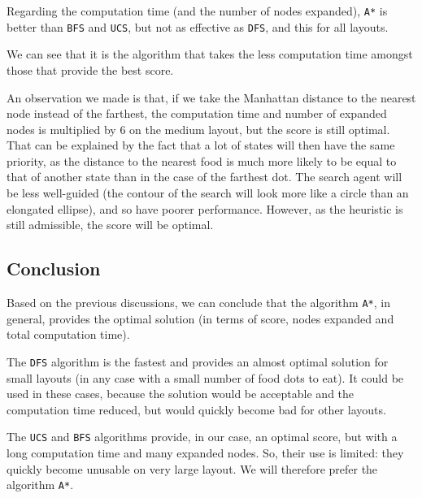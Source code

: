 \documentclass[a4paper, 12pt]{article}
\begin{document}
	Regarding the computation time (and the number of nodes expanded), \texttt{A*} is better than \texttt{BFS} and \texttt{UCS}, but not as effective as \texttt{DFS}, and this for all layouts.\par
	
	We can see that it is the algorithm that takes the less computation time amongst those that provide the best score.\par
	
	An observation we made is that, if we take the Manhattan distance to the nearest node instead of the farthest, the computation time and number of expanded nodes is multiplied by 6 on the medium layout, but the score is still optimal. That can be explained by the fact that a lot of states will then have the same priority, as the distance to the nearest food is much more likely to be equal to that of another state than in the case of the farthest dot. The search agent will be less well-guided (the contour of the search will look more like a circle than an elongated ellipse), and so have poorer performance. However, as the heuristic is still admissible, the score will be optimal.
	
	\subsection{Conclusion}
	Based on the previous discussions, we can conclude that the algorithm \texttt{A*}, in general, provides the optimal solution (in terms of score, nodes expanded and total computation time).\par
	
	The \texttt{DFS} algorithm is the fastest and provides an almost optimal solution for small layouts (in any case with a small number of food dots to eat). It could be used in these cases, because the solution would be acceptable and the computation time reduced, but would quickly become bad for other layouts.\par
	
	The \texttt{UCS} and \texttt{BFS} algorithms provide, in our case, an optimal score, but with a long computation time and many expanded nodes. So, their use is limited: they quickly become unusable on very large layout. We will therefore prefer the algorithm \texttt{A*}.
\end{document}
